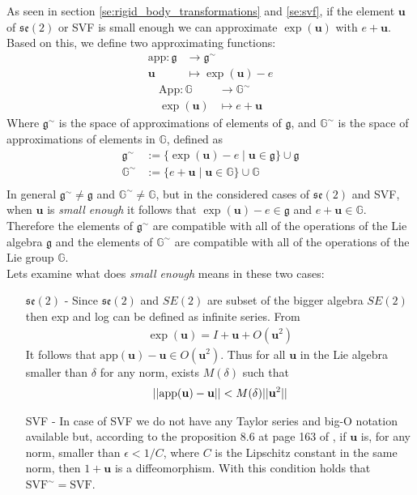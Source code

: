\noindent
As seen in section \ref{se:rigid_body_transformations} and \ref{se:svf}, if the element $\mathbf{u}$ of $\mathfrak{se}(2)$ or SVF is small enough we can approximate $\exp(\mathbf{u})$ with $e + \mathbf{u}$. Based on this, we define two approximating functions:
\begin{align*}
\text{app} : \mathfrak{g} & \longrightarrow  \mathfrak{g}^{\sim}    \\
\mathbf{u} &\longmapsto \exp(\mathbf{u}) - e
\end{align*}
\begin{align*}
\text{App} : \mathbb{G} & \longrightarrow  \mathbb{G}^{\sim}   \\
\exp(\mathbf{u}) &\longmapsto e + \mathbf{u}
\end{align*}
Where $\mathfrak{g} ^{\sim}$ is the space of approximations of elements of $\mathfrak{g} $, and $\mathbb{G}^{\sim} $ is the space of approximations of elements in $\mathbb{G}$, defined as
\begin{align*}
\mathfrak{g} ^{\sim} & := \{ \exp(\mathbf{u}) - e \mid \mathbf{u}\in \mathfrak{g}\} \cup \mathfrak{g} \\
\mathbb{G}^{\sim}  & := \{ e + \mathbf{u} \mid \mathbf{u}\in \mathbb{G}\} \cup \mathbb{G} \\
\end{align*}
In general $\mathfrak{g}^{\sim} \neq \mathfrak{g}$ and $\mathbb{G}^{\sim} \neq \mathbb{G}$, but in the considered cases of $\mathfrak{se}(2)$ and SVF, when $\mathbf{u}$ is \emph{small enough}
it follows that $\exp(\mathbf{u}) - e \in \mathfrak{g} $ and $e + \mathbf{u}\in \mathbb{G}$. Therefore the elements of $\mathfrak{g}^{\sim} $ are compatible with all of the operations of the Lie algebra $\mathfrak{g}$ and the elements of $\mathbb{G}^{\sim}$ are compatible with all of the operations of the Lie group $\mathbb{G}$.\\
Lets examine what does \emph{small enough} means in these two cases:
\begin{enumerate}
	\item[$\mathfrak{se}(2)$ -] Since $\mathfrak{se}(2)$ and $SE(2)$ are subset of the bigger algebra $SE(2)$ then exp and log can be defined as infinite series. From 
	\begin{align*}
	\exp(\mathbf{u}) = I + \mathbf{u} + O(\mathbf{u}^2) 
	\end{align*}
	It follows that $\text{app}(\mathbf{u}) - \mathbf{u} \in O(\mathbf{u}^2)$. Thus for all $\mathbf{u}$ in the Lie algebra smaller than $\delta$ for any norm, exists $M(\delta)$ such that
	\begin{align*}
	\vert\lvert \text{app}(\mathbf{u}) - \mathbf{u}  \rvert\vert < M(\delta) \vert\lvert \mathbf{u}^2 \rvert\vert
	\end{align*}
	\item[SVF -] In case of SVF we do not have any Taylor series and big-O notation available but, according to the proposition 8.6 at page 163 of \cite{younes2010shapes}, if $\mathbf{u}$ is, for any norm, smaller than $\epsilon<1/C$, where $C$ is the Lipschitz constant in the same norm, then $1 + \mathbf{u}$ is a diffeomorphism. With this condition holds that
	$\text{SVF}^{\sim} = \text{SVF}$. 
\end{enumerate}

